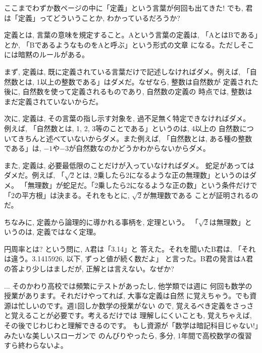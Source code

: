 ここまでわずか数ページの中に「定義」という言葉が何回も出てきた! 
でも, 君は「定義」ってどういうことか, わかっているだろうか?

定義とは, 言葉の意味を規定すること。Aという言葉の定義は, 
「AとはBである」とか, 「BであるようなものをAと呼ぶ」という形式の文章
になる。ただしそこには暗黙のルールがある。\mv

まず, 定義は, 既に定義されている言葉だけで記述しなければダメ。例えば, 
「自然数とは, 1以上の整数である」はダメだ。なぜなら, 整数は自然数が
定義された後に, 自然数を使って定義されるものであり, 自然数の定義の
時点では, 整数はまだ定義されていないからだ。\mv

次に, 定義は, その言葉の指し示す対象を, 過不足無く特定できなければダメ。
例えば, 「自然数とは, 1, 2, 3等のことである」というのは, 4以上の
自然数についてきちんと述べていないからダメ。また例えば, 「自然数とは, 
ある種の整数である」は, $-1$や$-3$が自然数なのかどうかわからないからダメ。\mv

また, 定義は, 必要最低限のことだけが入っていなければダメ。
蛇足があってはダメだ。例えば, 
「$\sqrt{2}$とは, 2乗したら2になるような正の無理数」というのはダメ。
「無理数」が蛇足だ。「2乗したら2になるような正の数」という条件だけで
「2の平方根」は決まる。それをもとに, $\sqrt{2}$が無理数である
ことが証明されるのだ。

ちなみに, 定義から論理的に導かれる事柄を, 定理という。
「$\sqrt{2}$は無理数」というのは, 定義ではなく定理。\mv

\begin{q}\label{q:alg_def_pi} 円周率とは? という問に, A君は「3.14」と
答えた。それを聞いたB君は, 「それは違う。3.1415926, 以下, ずっと値が続く数だよ」
と言った。B君の発言はA君の答より少しはましだが, 正解とは言えない。なぜか?
\end{q}

\begin{faq}{\small{}
 ... そのかわり高校では頻繁にテストがあったし, 他学類では週に
何回も数学の授業があります。それだけやってれば, 大事な定義は自然
に覚えちゃう。でも資源は忙しいのです。週1回しか数学の授業がない
ので, 覚えるべき定義をさっさと覚えることが必要です。考えるだけでは
理解しにくいことも, 覚えちゃえば, その後でじわじわと理解できるのです。
もし資源が「数学は暗記科目じゃない!」みたいな美しいスローガンで
のんびりやったら, 多分, 1年間で高校数学の復習すら終わらないよ。}\end{faq}

